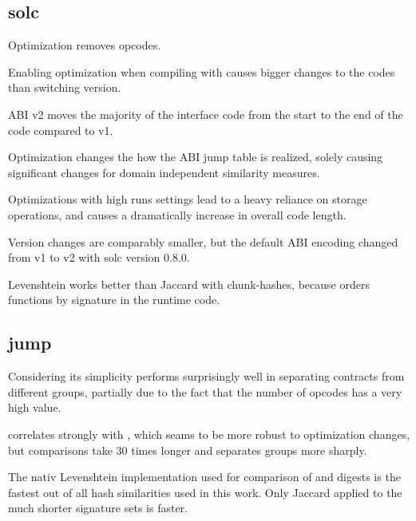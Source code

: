 \documentclass[../main.tex]{subfiles}
\begin{document}
\subsection{solc}
\begin{obs}
  Optimization removes  opcodes.
\end{obs}
\begin{obs}
  Enabling optimization when compiling with  causes bigger changes to the codes than switching  version.
\end{obs}
\begin{obs}
  ABI v2 moves the majority of the interface code from the start to the end of the code compared to v1. 
\end{obs}
\begin{obs}
  Optimization changes the how the ABI jump table is realized, solely causing significant changes for domain independent similarity measures.
\end{obs}
\begin{obs}
  Optimizations with high runs settings lead to a heavy reliance on storage operations, and causes a dramatically increase in overall code length. 
\end{obs}
\begin{obs}
  Version changes are comparably smaller, but the default ABI encoding changed from v1 to v2 with solc version 0.8.0.
\end{obs}

\begin{res}
  Levenshtein works better than Jaccard with chunk-hashes, because  orders functions by signature in the runtime code.
\end{res}

\subsection{jump}

\begin{hyp}
  Considering its simplicity  performs surprisingly well in separating contracts from different groups, partially due to the fact that the number of  opcodes has a very high  value.
\end{hyp}
\begin{obs}
   correlates strongly with , which seams to be more robust to optimization changes, but comparisons take 30 times longer and  separates groups more sharply.
\end{obs}
\begin{obs}
  The nativ Levenshtein implementation used for comparison of  and  digests is the fastest out of all hash similarities used in this work. Only Jaccard applied to the much shorter  signature sets is faster.
\end{obs}
\end{document}
